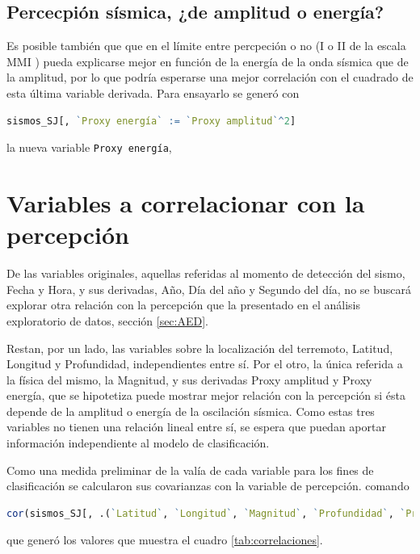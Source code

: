 \documentclass[a4paper]{report}
\begin{document}
\subsection{Percecpión sísmica, ¿de amplitud o energía?}
Es posible también que que en el límite entre percpeción o no (I o II de la escala MMI \cite{noauthor_intensidad_2022}) pueda explicarse mejor en función de la energía de la onda sísmica que de la amplitud, por lo que podría esperarse una mejor correlación con el cuadrado de esta última variable derivada.
Para ensayarlo se generó con
\begin{lstlisting}[breaklines=true, language=R]
sismos_SJ[, `Proxy energía` := `Proxy amplitud`^2]
\end{lstlisting}
la nueva variable \lstinline[language = R]'Proxy energía', 


\section{Variables a correlacionar con la percepción}\label{sec:correlaciones}
De las variables originales, aquellas referidas al momento de detección del sismo, Fecha y Hora, y sus derivadas, Año, Día del año y Segundo del día, no se buscará explorar otra relación con la percepción que la presentado en el análisis exploratorio de datos, sección \ref{sec:AED}.

Restan, por un lado, las variables sobre la localización del terremoto, Latitud, Longitud y Profundidad, independientes entre sí.
Por el otro, la única referida a la física del mismo, la Magnitud, y sus derivadas Proxy amplitud y Proxy energía, que se hipotetiza puede mostrar mejor relación con la percepción si ésta depende de la amplitud o energía de la oscilación sísmica.
Como estas tres variables no tienen una relación lineal entre sí, se espera que puedan aportar información independiente al modelo de clasificación.

Como una medida preliminar de la valía de cada variable para los fines de clasificación se calcularon sus covarianzas con la variable de percepción.
 comando
\begin{lstlisting}[breaklines=true, language=R]
 cor(sismos_SJ[, .(`Latitud`, `Longitud`, `Magnitud`, `Profundidad`, `Proxy amplitud`, `Proxy energia`, Percibido)])
\end{lstlisting}	
 que generó los valores que muestra el cuadro \ref{tab:correlaciones}. 
\end{document}
